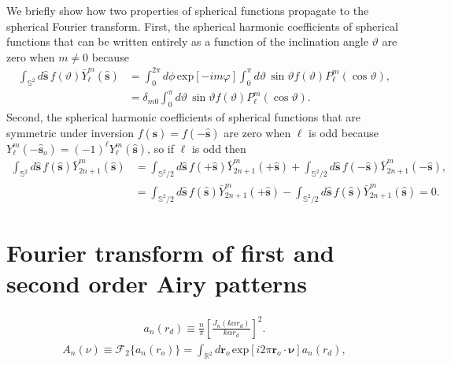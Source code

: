 \documentclass{osa-article}
\providecommand{\ro}{\mathbf{\mathbf{r}}_o}
\providecommand{\so}{\mathbf{\hat{s}}_o}
\providecommand{\mh}[1]{\mathbf{\hat{#1}}}
\providecommand{\mbb}[1]{\mathbb{#1}}
\providecommand{\bs}[1]{\boldsymbol{#1}}
\begin{document}
We briefly show how two properties of spherical functions propagate to the
spherical Fourier transform. First, the spherical harmonic coefficients of
spherical functions that can be written entirely as a function of the
inclination angle $\vartheta$ are zero when $m\neq0$ because
\begin{align}
  \int_{\mbb{S}^2}d\mh{s}\, f(\vartheta)\bar{Y}_\ell^m(\mh{s}) &= \int_0^{2\pi}d\phi\, \text{exp}[-im\varphi]\int_0^{\pi}d\vartheta\, \sin\vartheta f(\vartheta)P_\ell^m(\cos\vartheta),\\ &= \delta_{m0}\int_0^{\pi}d\vartheta\, \sin\vartheta f(\vartheta)P_\ell^m(\cos\vartheta).
\end{align}
Second, the spherical harmonic coefficients of spherical functions that are
symmetric under inversion $f(\mh{s}) = f(-\mh{s})$ are zero when $\ell$ is odd
because $Y_\ell^m(-\so) = (-1)^\ell Y_\ell^m(\mh{s})$, so if $\ell$ is odd then
\begin{align}
  \int_{\mbb{S}^2}d\mh{s}\, f(\mh{s})\bar{Y}_{2n+1}^m(\mh{s}) &= \int_{\mbb{S}^2/2}d\mh{s}\, f(+\mh{s})\bar{Y}_{2n+1}^m(+\mh{s}) + \int_{\mbb{S}^2/2}d\mh{s}\, f(-\mh{s})\bar{Y}_{2n+1}^m(-\mh{s}),\\
&=\int_{\mbb{S}^2/2}d\mh{s}\, f(\mh{s})\bar{Y}_{2n+1}^m(+\mh{s}) - \int_{\mbb{S}^2/2}d\mh{s}\, f(\mh{s})\bar{Y}_{2n+1}^m(\mh{s}) = 0.                                                                
\end{align}
\section{Fourier transform of first and second order Airy patterns} \label{sec:airy}
\begin{align}
    a_n(r_d) \equiv \frac{n}{\pi}\left[\frac{J_n(k\alpha r_d)}{k\alpha r_d}\right]^2. 
\end{align}
\begin{align}
  A_n(\nu) \equiv \mathcal{F}_2\{a_n(r_o)\} =  \int_{\mbb{R}^2}d\ro{}\,\text{exp}\left[i2\pi \ro{}\cdot\bs{\nu}\right] a_n(r_d), \label{eq:ftA}
\end{align}
\end{document}
